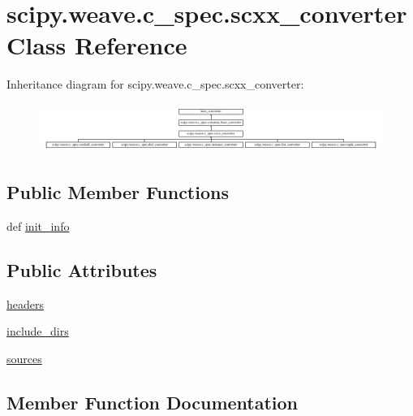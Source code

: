 \hypertarget{classscipy_1_1weave_1_1c__spec_1_1scxx__converter}{}\section{scipy.\+weave.\+c\+\_\+spec.\+scxx\+\_\+converter Class Reference}
\label{classscipy_1_1weave_1_1c__spec_1_1scxx__converter}
Inheritance diagram for scipy.\+weave.\+c\+\_\+spec.\+scxx\+\_\+converter\+:\begin{figure}[H]
\begin{center}
\leavevmode
\includegraphics[height=1.588652cm]{classscipy_1_1weave_1_1c__spec_1_1scxx__converter}
\end{center}
\end{figure}
\subsection*{Public Member Functions}
\begin{DoxyCompactItemize}
\item 
def \hyperlink{classscipy_1_1weave_1_1c__spec_1_1scxx__converter_a69c6569e99e4bffeca344e01eef70b5e}{init\+\_\+info}
\end{DoxyCompactItemize}
\subsection*{Public Attributes}
\begin{DoxyCompactItemize}
\item 
\hyperlink{classscipy_1_1weave_1_1c__spec_1_1scxx__converter_abee9ba9ea3ea731d22e2e0f311990766}{headers}
\item 
\hyperlink{classscipy_1_1weave_1_1c__spec_1_1scxx__converter_a4dc9743430329015f148384be2520045}{include\+\_\+dirs}
\item 
\hyperlink{classscipy_1_1weave_1_1c__spec_1_1scxx__converter_a964030b67b71acb78c2f221826778104}{sources}
\end{DoxyCompactItemize}


\subsection{Member Function Documentation}
\hypertarget{classscipy_1_1weave_1_1c__spec_1_1scxx__converter_a69c6569e99e4bffeca344e01eef70b5e}{}
